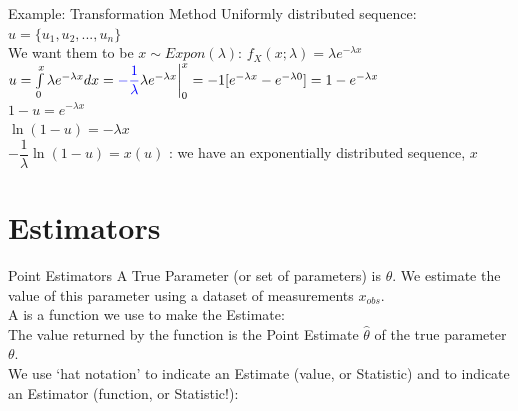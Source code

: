 \documentclass[10pt,sans,english,compress,xcolor=dvipsnames]{beamer}
\begin{document}
\begin{frame}{Example: Transformation Method}
\footnotesize
Uniformly distributed sequence: $u = \{u_1, u_2, ..., u_n\}$\\[1ex]

We want them to be $x\sim Expon(\lambda)$:  $f_X(x;\lambda) = \lambda e^{-\lambda x}$\\[1ex]

$u = \int\limits_0^{x}  \lambda e^{-\lambda x} dx =   \textcolor{blue}{-\dfrac{1}{\lambda}} \lambda e^{-\lambda x}\bigg|^{x}_0 =  -1 [ e^{-\lambda x}  -  e^{-\lambda 0} ] = 1 - e^{-\lambda x} $\\

$1 - u = e^{-\lambda x} $\\

$\ln{ (1 - u) }  = - \lambda x $\\

$- \dfrac{ 1 }{\lambda} \ln{ (1 - u) }  =  x(u) $ : we have an exponentially distributed sequence, $x$\\[1ex]

\end{frame} 


%
%
%


\section{Estimators}

\begin{frame}{Point Estimators}
\footnotesize
A True Parameter (or set of parameters) is $\theta$. We estimate the value of this parameter using a dataset of measurements $x_{obs}$.\\[1ex]

A  is a function we use to make the Estimate: \\[1ex]

The value returned by the function is the Point Estimate  $\hat{\theta}$ of the true parameter $\theta$.\\[1ex]

We use `hat notation' to indicate an Estimate (value, or Statistic) and to indicate an Estimator (function, or Statistic!):\\

\centering
{}\\[2ex]

\end{frame} 
\end{document}
